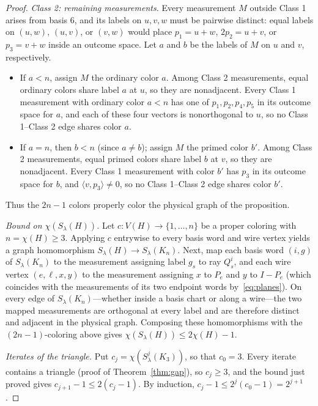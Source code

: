 \begin{proof}
\emph{Class 2: remaining measurements.} Every measurement $M$ outside Class 1 arises from basis $6$, and its labels on $u,v,w$ must be pairwise distinct: equal labels on $(u,w)$, $(u,v)$, or $(v,w)$ would place $p_1=u+w$, $2p_2=u+v$, or $p_3=v+w$ inside an outcome space. Let $a$ and $b$ be the labels of $M$ on $u$ and $v$, respectively.
\begin{itemize}
\item If $a<n$, assign $M$ the ordinary color $a$. Among Class 2 measurements, equal ordinary colors share label $a$ at $u$, so they are nonadjacent. Every Class 1 measurement with ordinary color $a<n$ has one of $p_1,p_2,p_4,p_5$ in its outcome space for $a$, and each of these four vectors is nonorthogonal to $u$, so no Class 1--Class 2 edge shares color $a$.
\item If $a=n$, then $b<n$ (since $a\ne b$); assign $M$ the primed color $b'$. Among Class 2 measurements, equal primed colors share label $b$ at $v$, so they are nonadjacent. Every Class 1 measurement with color $b'$ has $p_3$ in its outcome space for $b$, and $\langle v,p_3\rangle\ne0$, so no Class 1--Class 2 edge shares color $b'$.
\end{itemize}
Thus the $2n-1$ colors properly color the physical graph of the proposition.

\emph{Bound on $\chi(S_\lambda(H))$.} Let $c:V(H)\to\{1,\ldots,n\}$ be a proper coloring with $n=\chi(H)\ge3$. Applying $c$ entrywise to every basis word and wire vertex yields a graph homomorphism $S_\lambda(H)\to S_\lambda(K_n)$. Next, map each basis word $(i,g)$ of $S_\lambda(K_n)$ to the measurement assigning label $g_s$ to ray $Q^i_s$, and each wire vertex $(e,\ell,x,y)$ to the measurement assigning $x$ to $P_e$ and $y$ to $I-P_e$ (which coincides with the measurements of its two endpoint words by~\eqref{eq:planes}). On every edge of $S_\lambda(K_n)$---whether inside a basis chart or along a wire---the two mapped measurements are orthogonal at every label and are therefore distinct and adjacent in the physical graph. Composing these homomorphisms with the $(2n-1)$-coloring above gives $\chi(S_\lambda(H))\le2\chi(H)-1$.

\emph{Iterates of the triangle.} Put $c_j=\chi(S^j_\lambda(K_3))$, so that $c_0=3$. Every iterate contains a triangle (proof of Theorem~\ref{thm:gap}), so $c_j\ge3$, and the bound just proved gives $c_{j+1}-1\le2(c_j-1)$. By induction, $c_j-1\le2^j(c_0-1)=2^{j+1}$.
\end{proof}
